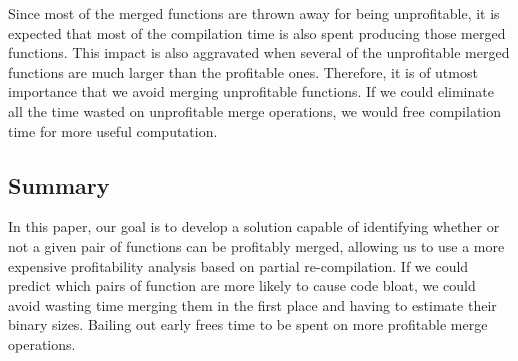 
Since most of the merged functions are thrown away for being unprofitable, it is expected that most of the compilation time is also spent producing those merged functions.
This impact is also aggravated when several of the unprofitable merged functions are much larger than the profitable ones.
Therefore, it is of utmost importance that we avoid merging unprofitable functions.
If we could eliminate all the time wasted on unprofitable merge operations, we would free compilation time for more useful computation.



\subsection{Summary}

In this paper, our goal is to develop a solution capable of identifying whether or not a given pair of functions can be profitably merged, allowing us to use a more expensive profitability analysis based on partial re-compilation.
If we could predict which pairs of function are more likely to cause code bloat, we could avoid wasting time merging them in the first place and having to estimate their binary sizes.
Bailing out early frees time to be spent on more profitable merge operations.

